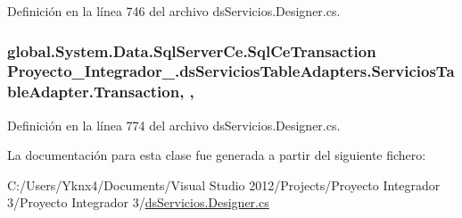 Definición en la línea 746 del archivo ds\-Servicios.\-Designer.\-cs.

\hypertarget{class_proyecto___integrador__3_1_1ds_servicios_table_adapters_1_1_servicios_table_adapter_a3e7fe5479416cffb20c9576cdefb7e8e}{
\subsubsection[{Transaction}]{\setlength{\rightskip}{0pt plus 5cm}global.\-System.\-Data.\-Sql\-Server\-Ce.\-Sql\-Ce\-Transaction Proyecto\-\_\-\-Integrador\-\_.\-ds\-Servicios\-Table\-Adapters.\-Servicios\-Table\-Adapter.\-Transaction\hspace{0.3cm}{\ttfamily [get]}, {\ttfamily [set]}, {\ttfamily [package]}}}\label{class_proyecto___integrador__3_1_1ds_servicios_table_adapters_1_1_servicios_table_adapter_a3e7fe5479416cffb20c9576cdefb7e8e}


Definición en la línea 774 del archivo ds\-Servicios.\-Designer.\-cs.



La documentación para esta clase fue generada a partir del siguiente fichero\-:\begin{DoxyCompactItemize}
\item 
C\-:/\-Users/\-Yknx4/\-Documents/\-Visual Studio 2012/\-Projects/\-Proyecto Integrador 3/\-Proyecto Integrador 3/\hyperlink{ds_servicios_8_designer_8cs}{ds\-Servicios.\-Designer.\-cs}\end{DoxyCompactItemize}
